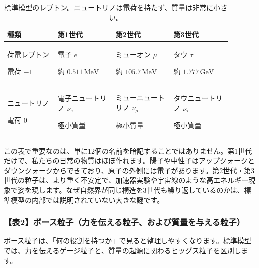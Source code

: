 \begin{table}[htbp]
\centering
\small
\setlength{\tabcolsep}{4pt}
\renewcommand{\arraystretch}{1.25}
\begin{tabular}{p{0.20\linewidth}p{0.23\linewidth}p{0.23\linewidth}p{0.23\linewidth}}
\hline
種類 & 第1世代 & 第2世代 & 第3世代 \\
\hline
荷電レプトン\par 電荷 \(-1\) & 電子 \(e\)\par 約 \(0.511\,\mathrm{MeV}\) & ミューオン \(\mu\)\par 約 \(105.7\,\mathrm{MeV}\) & タウ \(\tau\)\par 約 \(1.777\,\mathrm{GeV}\) \\
ニュートリノ\par 電荷 \(0\) & 電子ニュートリノ \(\nu_e\)\par 極小質量 & ミューニュートリノ \(\nu_\mu\)\par 極小質量 & タウニュートリノ \(\nu_\tau\)\par 極小質量 \\
\hline
\end{tabular}
\caption{標準模型のレプトン。ニュートリノは電荷を持たず、質量は非常に小さい。}
\end{table}

この表で重要なのは、単に12個の名前を暗記することではありません。第1世代だけで、私たちの日常の物質はほぼ作れます。陽子や中性子はアップクォークとダウンクォークからできており、原子の外側には電子があります。第2世代・第3世代の粒子は、より重く不安定で、加速器実験や宇宙線のような高エネルギー現象で姿を現します。なぜ自然界が同じ構造を3世代も繰り返しているのかは、標準模型の内部では説明されていない大きな謎です。

\subsubsection{【表2】ボース粒子（力を伝える粒子、および質量を与える粒子）}

ボース粒子は、「何の役割を持つか」で見ると整理しやすくなります。標準模型では、力を伝えるゲージ粒子と、質量の起源に関わるヒッグス粒子を区別します。

